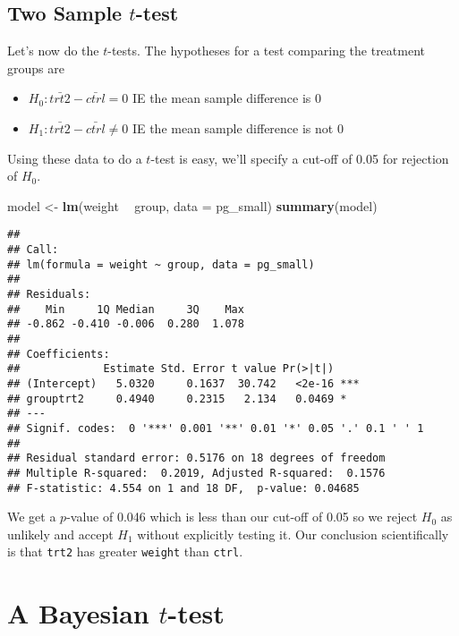 \documentclass[
]{book}
\newenvironment{Shaded}{\begin{snugshade}}{\end{snugshade}}
\newcommand{\DataTypeTok}[1]{\textcolor[rgb]{0.13,0.29,0.53}{#1}}
\newcommand{\KeywordTok}[1]{\textcolor[rgb]{0.13,0.29,0.53}{\textbf{#1}}}
\newcommand{\NormalTok}[1]{#1}
\newcommand{\OperatorTok}[1]{\textcolor[rgb]{0.81,0.36,0.00}{\textbf{#1}}}
\newcommand{\StringTok}[1]{\textcolor[rgb]{0.31,0.60,0.02}{#1}}
\providecommand{\tightlist}{%
  \setlength{\itemsep}{0pt}\setlength{\parskip}{0pt}}
\begin{document}
\hypertarget{two-sample-t-test}{%
\subsection{\texorpdfstring{Two Sample \(t\)-test}{Two Sample t-test}}\label{two-sample-t-test}}

Let's now do the \(t\)-tests. The hypotheses for a test comparing the treatment groups are

\begin{itemize}
\tightlist
\item
  \(H_0 : \bar{trt2} - \bar{ctrl} = 0\) IE the mean sample difference is 0
\item
  \(H_1 : \bar{trt2} - \bar{ctrl} \neq 0\) IE the mean sample difference is not 0
\end{itemize}

Using these data to do a \(t\)-test is easy, we'll specify a cut-off of 0.05 for rejection of \(H_0\).

\begin{Shaded}
\begin{Highlighting}[]
\NormalTok{model <-}\StringTok{ }\KeywordTok{lm}\NormalTok{(weight }\OperatorTok{~}\StringTok{ }\NormalTok{group, }\DataTypeTok{data =}\NormalTok{ pg_small)}
\KeywordTok{summary}\NormalTok{(model)}
\end{Highlighting}
\end{Shaded}

\begin{verbatim}
## 
## Call:
## lm(formula = weight ~ group, data = pg_small)
## 
## Residuals:
##    Min     1Q Median     3Q    Max 
## -0.862 -0.410 -0.006  0.280  1.078 
## 
## Coefficients:
##             Estimate Std. Error t value Pr(>|t|)    
## (Intercept)   5.0320     0.1637  30.742   <2e-16 ***
## grouptrt2     0.4940     0.2315   2.134   0.0469 *  
## ---
## Signif. codes:  0 '***' 0.001 '**' 0.01 '*' 0.05 '.' 0.1 ' ' 1
## 
## Residual standard error: 0.5176 on 18 degrees of freedom
## Multiple R-squared:  0.2019, Adjusted R-squared:  0.1576 
## F-statistic: 4.554 on 1 and 18 DF,  p-value: 0.04685
\end{verbatim}

We get a \(p\)-value of 0.046 which is less than our cut-off of 0.05 so we reject \(H_0\) as unlikely and accept \(H_1\) without explicitly testing it. Our conclusion scientifically is that \texttt{trt2} has greater \texttt{weight} than \texttt{ctrl}.

\hypertarget{a-bayesian-t-test}{%
\section{\texorpdfstring{A Bayesian \(t\)-test}{A Bayesian t-test}}\label{a-bayesian-t-test}}
\end{document}
